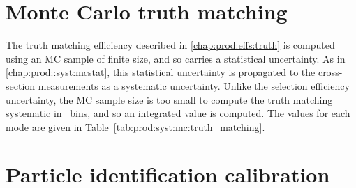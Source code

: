 \begin{table}
  \caption{%
    Relative uncertainty on the \PDzero cross-section, in \PDzero \pTy\ bins, 
    due to the finite size of the Monte Carlo sample used to assess the truth 
    matching efficiency.
  }
  \label{tab:prod:syst:mc:result}
  \centering
  
\end{table}

\section{Monte Carlo truth matching}
\label{chap:prod:syst:mc:truth_matching}

The truth matching efficiency described in \cref{chap:prod:effs:truth} is computed using an \ac{MC} 
sample of finite size, and so carries a statistical uncertainty.
As in \cref{chap:prod::syst:mcstat}, this statistical uncertainty is propagated to the cross-section 
measurements as a systematic uncertainty.
Unlike the selection efficiency uncertainty, the \ac{MC} sample size is too 
small to compute the truth matching systematic in \pTy\ bins, and so an 
integrated value is computed.
The values for each mode are given in Table~\ref{tab:prod:syst:mc:truth_matching}.

\begin{table}
  \caption{%
    Relative uncertainty on the \PDzero cross-section, in \PDzero \pTy\ bins, 
    due to the finite size of the Monte Carlo sample used to compute the truth 
    matching efficiency.
  }
  \label{tab:prod:syst:mc:truth_matching}
  \centering
  
\end{table}


\section{Particle identification calibration}
\label{chap:prod:syst:pid}

